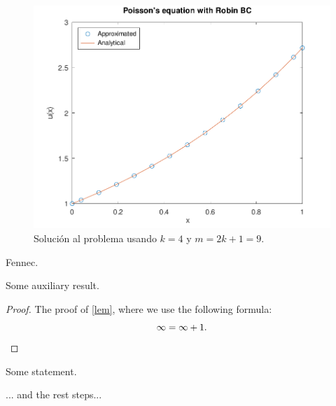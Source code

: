 \begin{problem}
\begin{figure}[ht!]
    \centering
    \includegraphics[width=.6\paperwidth]{../examples/octave/elliptic1D.pdf}
    \caption{Solución al problema usando $k=4$ y $m=2k+1=9$.}
\end{figure}

\noQED %
\end{problem}

\begin{problem}
Fennec.
\end{problem}

\begin{solution}
    \begin{lemma}\label{lem}
        Some auxiliary result.
    \end{lemma}
    \begin{proof}
        The proof of \cref{lem}, where we use the following formula:
        \[
            \infty = \infty + 1.
            \qedhere %
        \]
    \end{proof}
    \begin{fact}
        \proofless %
        Some statement.
    \end{fact}
    ... and the rest steps...
\end{solution}